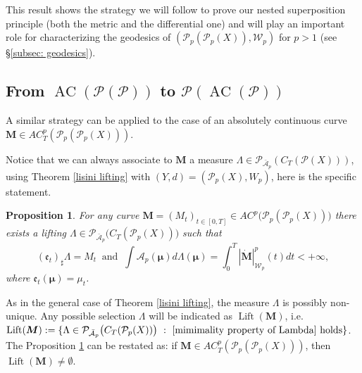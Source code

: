 \documentclass[10pt,leqno]{amsart}
\numberwithin{equation}{section}
\newtheorem{prop}[teorema]{Proposition}
\newcommand{\PP}{\mathcal{P}}
\begin{document}
This result shows the strategy we will follow to prove our nested superposition principle (both the metric and the differential one) and will play an important role for characterizing the geodesics of $(\PP_p(\PP_p(X)),\mathcal{W}_p)$ for $p>1$ (see §\ref{subsec: geodesics}).






\subsection{From \texorpdfstring{$\operatorname{AC}(\PP(\PP))$}{} to \texorpdfstring{$\PP(\operatorname{AC}(\PP))$}{}}\label{from ac(pp) to P(ac(p))}

A similar strategy can be applied to the case of an absolutely continuous curve $\boldsymbol{M}\in AC_T^p(\PP_p(\PP_p(X)))$. 



Notice that we can always associate to $\boldsymbol{M}$ a measure $\Lambda \in \PP_{\bar{\mathcal{A}}_p}(C_T(\PP(X)))$, using Theorem \ref{lisini lifting} with $(Y,d) = (\PP_p(X),W_p)$, here is the specific statement.

\begin{prop}\label{prop: acpp to pacp}
    For any curve $\boldsymbol{M}=(M_t)_{t\in[0,T]} \in AC^p\big(\PP_p(\PP_p(X))\big)$ there exists a lifting $\Lambda \in \mathcal{P}_{\bar{\mathcal{A}}_p}\big( C_T(\mathcal{P}_p(X))\big)$ such that
    \begin{equation}\label{mimimality property of Lambda}
        (\mathfrak{e}_t)_\sharp \Lambda = M_t \
    \text{ and }
    \ \int\mathcal{A}_p(\boldsymbol{\mu}) d\Lambda(\boldsymbol{\mu}) = \int_0^T |\dot{\boldsymbol{M}}|_{\mathcal{W}_p}^p(t) dt<+\infty,
    \end{equation}
    where $\mathfrak{e}_t(\boldsymbol{\mu})=\mu_t$.
\end{prop}

As in the general case of Theorem \ref{lisini lifting}, the measure $\Lambda$ is possibly non-unique. Any possible selection $\Lambda$ will be indicated as $\operatorname{Lift}(\boldsymbol{M})$, i.e. $\operatorname{Lift}(\boldsymbol{M}) := \{\Lambda \in \PP_{\bar{\mathcal{A}}_p}\big( C_T(\mathcal{P}_p(X))\big) \ : \ \eqref{mimimality property of Lambda} \text{ holds}\}$. The Proposition \ref{prop: acpp to pacp} can be restated as: if $\boldsymbol{M}\in AC_T^p(\PP_p(\PP_p(X)))$, then $\operatorname{Lift}(\boldsymbol{M}) \neq \emptyset$.
\end{document}
